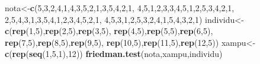 \documentclass[
]{article}
\newenvironment{Shaded}{\begin{snugshade}}{\end{snugshade}}
\newcommand{\DecValTok}[1]{\textcolor[rgb]{0.00,0.00,0.81}{#1}}
\newcommand{\FunctionTok}[1]{\textcolor[rgb]{0.13,0.29,0.53}{\textbf{#1}}}
\newcommand{\NormalTok}[1]{#1}
\newcommand{\OtherTok}[1]{\textcolor[rgb]{0.56,0.35,0.01}{#1}}
\begin{document}
\begin{Shaded}
\begin{Highlighting}[]
\NormalTok{nota}\OtherTok{\textless{}{-}}\FunctionTok{c}\NormalTok{(}\DecValTok{5}\NormalTok{,}\DecValTok{3}\NormalTok{,}\DecValTok{2}\NormalTok{,}\DecValTok{4}\NormalTok{,}\DecValTok{1}\NormalTok{,}\DecValTok{4}\NormalTok{,}\DecValTok{3}\NormalTok{,}\DecValTok{5}\NormalTok{,}\DecValTok{2}\NormalTok{,}\DecValTok{1}\NormalTok{,}\DecValTok{3}\NormalTok{,}\DecValTok{5}\NormalTok{,}\DecValTok{4}\NormalTok{,}\DecValTok{2}\NormalTok{,}\DecValTok{1}\NormalTok{,}
\DecValTok{4}\NormalTok{,}\DecValTok{5}\NormalTok{,}\DecValTok{1}\NormalTok{,}\DecValTok{2}\NormalTok{,}\DecValTok{3}\NormalTok{,}\DecValTok{3}\NormalTok{,}\DecValTok{4}\NormalTok{,}\DecValTok{5}\NormalTok{,}\DecValTok{1}\NormalTok{,}\DecValTok{2}\NormalTok{,}\DecValTok{5}\NormalTok{,}\DecValTok{3}\NormalTok{,}\DecValTok{4}\NormalTok{,}\DecValTok{2}\NormalTok{,}\DecValTok{1}\NormalTok{,}
\DecValTok{2}\NormalTok{,}\DecValTok{5}\NormalTok{,}\DecValTok{4}\NormalTok{,}\DecValTok{3}\NormalTok{,}\DecValTok{1}\NormalTok{,}\DecValTok{3}\NormalTok{,}\DecValTok{5}\NormalTok{,}\DecValTok{4}\NormalTok{,}\DecValTok{1}\NormalTok{,}\DecValTok{2}\NormalTok{,}\DecValTok{3}\NormalTok{,}\DecValTok{4}\NormalTok{,}\DecValTok{5}\NormalTok{,}\DecValTok{2}\NormalTok{,}\DecValTok{1}\NormalTok{,}
\DecValTok{4}\NormalTok{,}\DecValTok{5}\NormalTok{,}\DecValTok{3}\NormalTok{,}\DecValTok{1}\NormalTok{,}\DecValTok{2}\NormalTok{,}\DecValTok{5}\NormalTok{,}\DecValTok{3}\NormalTok{,}\DecValTok{2}\NormalTok{,}\DecValTok{4}\NormalTok{,}\DecValTok{1}\NormalTok{,}\DecValTok{5}\NormalTok{,}\DecValTok{4}\NormalTok{,}\DecValTok{3}\NormalTok{,}\DecValTok{2}\NormalTok{,}\DecValTok{1}\NormalTok{)}
\NormalTok{individu}\OtherTok{\textless{}{-}}\FunctionTok{c}\NormalTok{(}\FunctionTok{rep}\NormalTok{(}\DecValTok{1}\NormalTok{,}\DecValTok{5}\NormalTok{),}\FunctionTok{rep}\NormalTok{(}\DecValTok{2}\NormalTok{,}\DecValTok{5}\NormalTok{),}\FunctionTok{rep}\NormalTok{(}\DecValTok{3}\NormalTok{,}\DecValTok{5}\NormalTok{),}
\FunctionTok{rep}\NormalTok{(}\DecValTok{4}\NormalTok{,}\DecValTok{5}\NormalTok{),}\FunctionTok{rep}\NormalTok{(}\DecValTok{5}\NormalTok{,}\DecValTok{5}\NormalTok{),}\FunctionTok{rep}\NormalTok{(}\DecValTok{6}\NormalTok{,}\DecValTok{5}\NormalTok{),}
\FunctionTok{rep}\NormalTok{(}\DecValTok{7}\NormalTok{,}\DecValTok{5}\NormalTok{),}\FunctionTok{rep}\NormalTok{(}\DecValTok{8}\NormalTok{,}\DecValTok{5}\NormalTok{),}\FunctionTok{rep}\NormalTok{(}\DecValTok{9}\NormalTok{,}\DecValTok{5}\NormalTok{),}
\FunctionTok{rep}\NormalTok{(}\DecValTok{10}\NormalTok{,}\DecValTok{5}\NormalTok{),}\FunctionTok{rep}\NormalTok{(}\DecValTok{11}\NormalTok{,}\DecValTok{5}\NormalTok{),}\FunctionTok{rep}\NormalTok{(}\DecValTok{12}\NormalTok{,}\DecValTok{5}\NormalTok{))}
\NormalTok{xampu}\OtherTok{\textless{}{-}}\FunctionTok{c}\NormalTok{(}\FunctionTok{rep}\NormalTok{(}\FunctionTok{seq}\NormalTok{(}\DecValTok{1}\NormalTok{,}\DecValTok{5}\NormalTok{,}\DecValTok{1}\NormalTok{),}\DecValTok{12}\NormalTok{))}
\FunctionTok{friedman.test}\NormalTok{(nota,xampu,individu)}
\end{Highlighting}
\end{Shaded}
\end{document}
